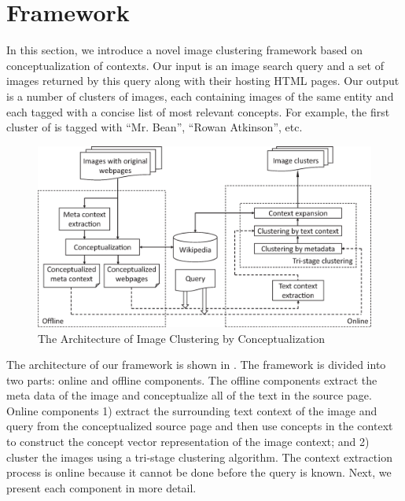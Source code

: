 \section{Framework}
\label{sec:algo}


In this section, we introduce a novel image clustering framework
based on conceptualization of contexts.
Our input is an image search query and
a set of images returned by this query along with their hosting HTML pages.
Our output is a number of clusters of images, each containing images
of the same entity and each tagged with a concise list of
most relevant concepts. For example, the first
cluster of  is tagged with ``Mr. Bean'',
``Rowan Atkinson'', etc.


\begin{figure}[th]
\begin{center}
\centering
\includegraphics[width=0.7\columnwidth]{framework_novisual.eps}
\caption{The Architecture of Image Clustering by Conceptualization}
\label{fig:frame}
\end{center}
\end{figure}

The architecture of our framework is shown in .
The framework is divided into two parts: online and offline components.
The offline components extract the meta data of the image and
conceptualize all of the text in the source page. Online components 1) extract
the surrounding text context of the image and query from the conceptualized
source page and then use concepts in the context to construct the concept vector
representation of the image context; and 2) cluster the images using
a tri-stage clustering algorithm. The context extraction process
is online because it cannot be done before the query is known.
Next, we present each component in more detail.

